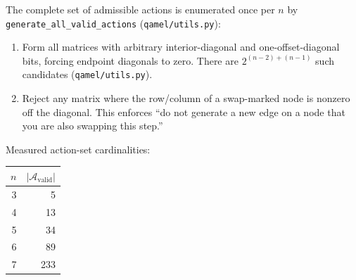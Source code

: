 \documentclass[11pt]{article}
\newcommand{\code}[1]{\texttt{#1}}
\newcommand{\file}[1]{\texttt{\small #1}}
\begin{document}
The complete set of admissible actions is enumerated once per $n$ by \code{generate\_all\_valid\_actions} (\file{qamel/utils.py}):
\begin{enumerate}
  \item Form all matrices with arbitrary interior-diagonal and one-offset-diagonal bits, forcing endpoint diagonals to zero. There are $2^{(n-2)+(n-1)}$ such candidates (\file{qamel/utils.py}).
  \item Reject any matrix where the row/column of a swap-marked node is nonzero off the diagonal. This enforces ``do not generate a new edge on a node that you are also swapping this step.''
\end{enumerate}
Measured action-set cardinalities:
\begin{center}
\begin{tabular}{rr}
\toprule
$n$ & $|\mathcal{A}_{\text{valid}}|$ \\
\midrule
3 & 5 \\
4 & 13 \\
5 & 34 \\
6 & 89 \\
7 & 233 \\
\bottomrule
\end{tabular}
\end{center}
\end{document}

